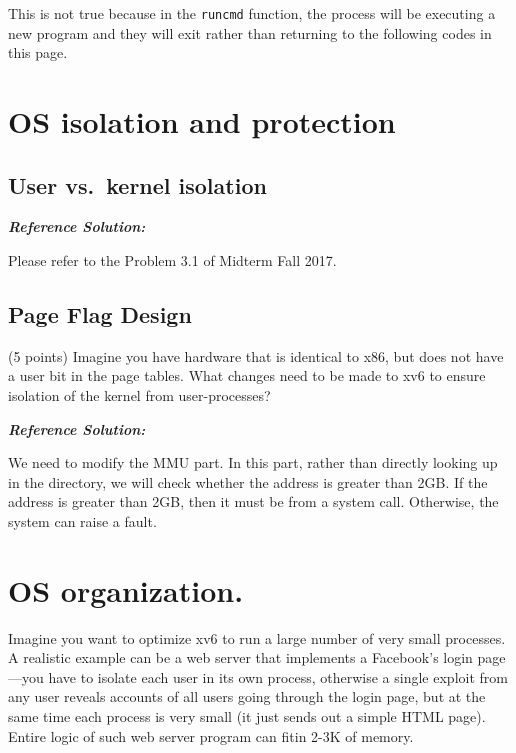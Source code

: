 \documentclass[]{article}
\begin{document}
This is not true because in the \texttt{runcmd} function, the process
will be executing a new program and they will exit rather than returning
to the following codes in this page.

\hypertarget{os-isolation-and-protection}{%
\section{OS isolation and
protection}\label{os-isolation-and-protection}}

\hypertarget{user-vs.kernel-isolation}{%
\subsection{User vs.~kernel isolation}\label{user-vs.kernel-isolation}}

\textbf{\emph{Reference Solution:}}

Please refer to the Problem 3.1 of Midterm Fall 2017.

\hypertarget{page-flag-design}{%
\subsection{Page Flag Design}\label{page-flag-design}}

(5 points) Imagine you have hardware that is identical to x86, but does
not have a user bit in the page tables. What changes need to be made to
xv6 to ensure isolation of the kernel from user-processes?

\textbf{\emph{Reference Solution:}}

We need to modify the MMU part. In this part, rather than directly
looking up in the directory, we will check whether the address is
greater than 2GB. If the address is greater than 2GB, then it must be
from a system call. Otherwise, the system can raise a fault.

\hypertarget{os-organization.}{%
\section{OS organization.}\label{os-organization.}}

Imagine you want to optimize xv6 to run a large number of very small
processes. A realistic example can be a web server that implements a
Facebook's login page---you have to isolate each user in its own
process, otherwise a single exploit from any user reveals accounts of
all users going through the login page, but at the same time each
process is very small (it just sends out a simple HTML page). Entire
logic of such web server program can fitin 2-3K of memory.
\end{document}
